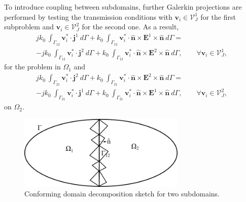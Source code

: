 \noindent To introduce coupling between subdomains, further Galerkin projections are performed by testing the transmission conditions with $\mathbf{v}_i \in \mathcal{V}_J^1$ for the first subproblem and $\mathbf{v}_i \in \mathcal{V}_J^2$ for the second one. As a result,
\begin{multline}
j k_0 \ \int_{\Gamma_{12}} \mathbf{v}_i^* \cdot \mathbf{j}^1 \ d\Gamma + k_0 \ \int_{\Gamma_{12}} \mathbf{v}_i^* \cdot \hat{\mathbf{n}} \times \mathbf{E}^1 \times \hat{\mathbf{n}} \ d\Gamma = \\
- jk_0 \ \int_{\Gamma_{12}} \mathbf{v}_i^* \cdot \mathbf{j}^2 \ d\Gamma + k_0 \
\int_{\Gamma_{12}} \mathbf{v}_i^* \cdot \hat{\mathbf{n}} \times \mathbf{E}^2 \times \hat{\mathbf{n}} \ d\Gamma, \qquad \forall \mathbf{v}_i \in \mathcal{V}_J^1,
\end{multline}
\noindent for the problem in $\Omega_1$ and
\begin{multline}
jk_0 \ \int_{\Gamma_{21}} \mathbf{v}_i^* \cdot \mathbf{j}^2 \ d\Gamma + k_0 \ \int_{\Gamma_{21}} \mathbf{v}_i^* \cdot \hat{\mathbf{n}} \times \mathbf{E}^2 \times \hat{\mathbf{n}} \ d\Gamma = \\
- jk_0 \ \int_{\Gamma_{21}} \mathbf{v}_i^* \cdot \mathbf{j}^1 \ d\Gamma + k_0 \
\int_{\Gamma_{21}} \mathbf{v}_i^* \cdot \hat{\mathbf{n}} \times \mathbf{E}^1 \times \hat{\mathbf{n}} \ d\Gamma, \qquad \forall \mathbf{v}_i \in \mathcal{V}_J^2,
\end{multline}
\noindent on $\Omega_2$.


\begin{figure}[ht!]
\centering
\includegraphics[width=8cm]{DDConforming}
\caption{Conforming domain decomposition sketch for two subdomains.}
\label{fig:DDConforming}
\end{figure}

